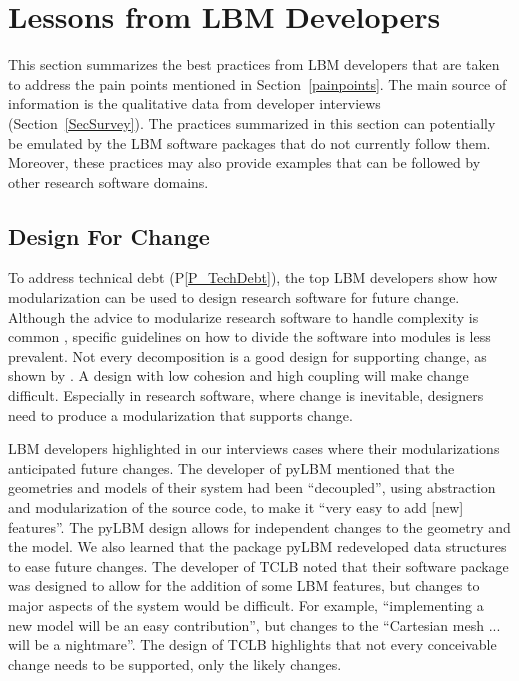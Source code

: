 \documentclass[final, 3p, times, authoryear]{elsarticle}
\newcommand{\ppref}[1]{P\ref{#1}}
\begin{document}
\section{Lessons from LBM Developers} \label{Sec_AddressConcerns}

This section summarizes the best practices from LBM developers that are taken to
address the pain points mentioned in Section~\ref{painpoints}.  The main source
of information is the qualitative data from developer interviews
(Section~\ref{SecSurvey}).  The practices summarized in this section can
potentially be emulated by the LBM software packages that do not currently
follow them.  Moreover, these practices may also provide examples that can be
followed by other research software domains.

\subsection{Design For Change} \label{Sec_DesForChange}

To address technical debt (\ppref{P_TechDebt}), the top LBM developers show how
modularization can be used to design research software for future change.
Although the advice to modularize research software to handle complexity is
common \citep{WilsonEtAl2014, StewartEtAl2017, Storer2017}, specific guidelines
on how to divide the software into modules is less prevalent.  Not every
decomposition is a good design for supporting change, as shown by
\citet{Parnas1972a}.  A design with low cohesion and high coupling \citep[p.\
48]{GhezziEtAl2003} will make change difficult. Especially in research software,
where change is inevitable, designers need to produce a modularization that
supports change. 

LBM developers highlighted in our interviews cases where their modularizations
anticipated future changes.  The developer of pyLBM mentioned that the
geometries and models of their system had been ``decoupled'', using abstraction
and modularization of the source code, to make it ``very easy to add [new]
features''.  The pyLBM design allows for independent changes to the geometry and
the model.  We also learned that the package pyLBM redeveloped data structures
to ease future changes. The developer of TCLB noted that their software package
was designed to allow for the addition of some LBM features, but changes to
major aspects of the system would be difficult. For example, ``implementing a
new model will be an easy contribution'', but changes to the ``Cartesian mesh
... will be a nightmare''.  The design of TCLB highlights that not every
conceivable change needs to be supported, only the likely changes.
\end{document}
